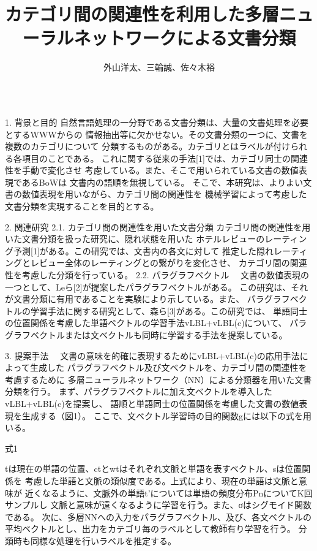 \documentclass[12pt,unicode]{beamer}
\title{カテゴリ間の関連性を利用した多層ニューラルネットワークによる文書分類}
\author{外山洋太、三輪誠、佐々木裕}
\institute{豊田工業大学 工学部 先端工学基礎学科}
\date{}
\begin{document}
\begin{frame}{}
\maketitle
\vspace{-5ex}
\begin{columns}[t]
\begin{column}{0.49\textwidth}

\begin{block}{1. 背景と目的}
自然言語処理の一分野である文書分類は、大量の文書処理を必要とするWWWからの
情報抽出等に欠かせない。その文書分類の一つに、文書を複数のカテゴリについて
分類するものがある。カテゴリとはラベルが付けられる各項目のことである。
これに関する従来の手法[1]では、カテゴリ同士の関連性を手動で変化させ
考慮している。また、そこで用いられている文書の数値表現であるBoWは
文書内の語順を無視している。
そこで、本研究は、よりよい文書の数値表現を用いながら、カテゴリ間の関連性を
機械学習によって考慮した文書分類を実現することを目的とする。
\end{block}

\begin{block}{2. 関連研究}
2.1. カテゴリ間の関連性を用いた文書分類
カテゴリ間の関連性を用いた文書分類を扱った研究に、隠れ状態を用いた
ホテルレビューのレーティング予測[1]がある。この研究では、文書内の各文に対して
推定した隠れレーティングとレビュー全体のレーティングとの繋がりを変化させ、
カテゴリ間の関連性を考慮した分類を行っている。
2.2. パラグラフベクトル
　文書の数値表現の一つとして、Leら[2]が提案したパラグラフベクトルがある。
この研究は、それが文書分類に有用であることを実験により示している。また、
パラグラフベクトルの学習手法に関する研究として、森ら[3]がある。この研究では、
単語同士の位置関係を考慮した単語ベクトルの学習手法vLBL+vLBL(c)について、
パラグラフベクトルまたは文ベクトルも同時に学習する手法を提案している。
\end{block}

\begin{block}{3. 提案手法}
　文書の意味を的確に表現するためにvLBL+vLBL(c)の応用手法によって生成した
パラグラフベクトル及び文ベクトルを、カテゴリ間の関連性を考慮するために
多層ニューラルネットワーク（NN）による分類器を用いた文書分類を行う。
まず、パラグラフベクトルに加え文ベクトルを導入したvLBL+vLBL(c)を提案し、
語順と単語同士の位置関係を考慮した文書の数値表現を生成する（図1）。
ここで、文ベクトル学習時の目的関数gには以下の式を用いる。

式1

tは現在の単語の位置、ctとwtはそれぞれ文脈と単語を表すベクトル、sは位置関係を
考慮した単語と文脈の類似度である。上式により、現在の単語は文脈と意味が
近くなるように、文脈外の単語t'については単語の頻度分布PnについてK回サンプルし
文脈と意味が遠くなるように学習を行う。また、σはシグモイド関数である。
次に、多層NNへの入力をパラグラフベクトル、及び、各文ベクトルの
平均ベクトルとし、出力をカテゴリ毎のラベルとして教師有り学習を行う。
分類時も同様な処理を行いラベルを推定する。


\end{block}
\end{column}
\end{columns}
\end{frame}
\end{document}
